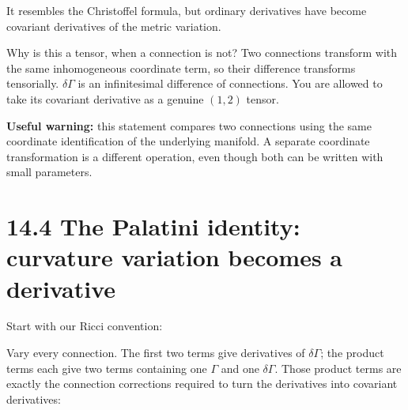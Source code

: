 \documentclass[
  11pt,
  letterpaper,
  oneside,
  openany]{scrbook}
\begin{document}
\begin{center}
\begingroup
{}
\ifdim\wd\grmathbox>\linewidth
\resizebox{\linewidth}{!}{\usebox{\grmathbox}}
\else\usebox{\grmathbox}\fi
\endgroup
\end{center}

It resembles the Christoffel formula, but ordinary derivatives have
become covariant derivatives of the metric variation.

Why is this a tensor, when a connection is not? Two connections
transform with the same inhomogeneous coordinate term, so their
difference transforms tensorially. \(\delta\Gamma\) is an infinitesimal
difference of connections. You are allowed to take its covariant
derivative as a genuine \((1,2)\) tensor.

\textbf{Useful warning:} this statement compares two connections using
the same coordinate identification of the underlying manifold. A
separate coordinate transformation is a different operation, even though
both can be written with small parameters.

\hypertarget{the-palatini-identity-curvature-variation-becomes-a-derivative}{%
\section{14.4 The Palatini identity: curvature variation becomes a
derivative}\label{the-palatini-identity-curvature-variation-becomes-a-derivative}}

Start with our Ricci convention:

\begin{center}
\begingroup
{}
\ifdim\wd\grmathbox>\linewidth
\resizebox{\linewidth}{!}{\usebox{\grmathbox}}
\else\usebox{\grmathbox}\fi
\endgroup
\end{center}

Vary every connection. The first two terms give derivatives of
\(\delta\Gamma\); the product terms each give two terms containing one
\(\Gamma\) and one \(\delta\Gamma\). Those product terms are exactly the
connection corrections required to turn the derivatives into covariant
derivatives:
\end{document}
